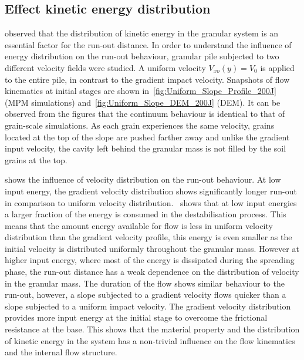 
\subsection*{Effect kinetic energy distribution}

\citet{Staron2005} observed that the distribution of kinetic energy in the 
granular system is an essential factor for the run-out distance. In order to 
understand the influence of energy distribution on the run-out behaviour, 
granular pile subjected to two different velocity fields were studied. A 
uniform velocity $V_{xo} (y) = V_0$ is applied to the entire pile, in contrast 
to the gradient impact velocity. Snapshots of flow kinematics at initial stages 
are shown in~\cref{fig:Uniform_Slope_Profile_200J} (MPM simulations) 
and~\cref{fig:Uniform_Slope_DEM_200J} (DEM). It can be observed from the 
figures that the continuum behaviour is identical to that of grain-scale 
simulations. As each grain experiences the same velocity, grains located at the 
top of the slope are pushed farther away and unlike the gradient input 
velocity, the cavity left behind the granular mass is not filled by the soil 
grains at the top. 

 shows the influence of velocity distribution on the 
run-out behaviour. At low input energy, the gradient velocity distribution 
shows significantly longer run-out in comparison to uniform velocity 
distribution.~ shows that at low input energies a larger 
fraction of the energy is consumed in the destabilisation process. This means 
that the amount energy available for flow is less in uniform velocity 
distribution than the gradient velocity profile, this energy is even smaller as 
the initial velocity is distributed uniformly throughout the granular mass. 
However at higher input energy, where most of the energy is dissipated during 
the spreading phase, the run-out distance has a weak dependence on the 
distribution of velocity in the granular mass. The duration of the flow shows 
similar behaviour to the run-out, however, a slope subjected to a gradient 
velocity flows quicker than a slope subjected to a uniform impact velocity. The 
gradient velocity distribution provides more input energy at the initial stage 
to overcome the frictional resistance at the base. This shows that the material 
property and the distribution of kinetic energy in the system has a non-trivial 
influence on the flow kinematics and the internal flow structure.

